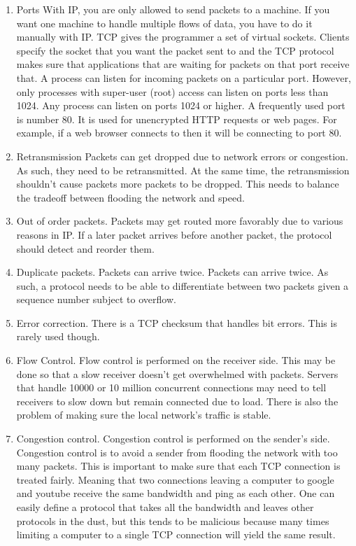 \begin{enumerate}
  \item Ports
  With IP, you are only allowed to send packets to a machine.
  If you want one machine to handle multiple flows of data, you have to do it manually with IP.
  TCP gives the programmer a set of virtual sockets.
  Clients specify the socket that you want the packet sent to and the TCP protocol makes sure that applications that are waiting for packets on that port receive that.
  A process can listen for incoming packets on a particular port.
  However, only processes with super-user (root) access can listen on ports less than 1024.
  Any process can listen on ports 1024 or higher.
  A frequently used port is number 80.
  It is used for unencrypted HTTP requests or web pages.
  For example, if a web browser connects to  then it will be connecting to port 80.

\item Retransmission
  Packets can get dropped due to network errors or congestion.
  As such, they need to be retransmitted.
  At the same time, the retransmission shouldn't cause packets more packets to be dropped.
  This needs to balance the tradeoff between flooding the network and speed.

\item Out of order packets.
  Packets may get routed more favorably due to various reasons in IP.
  If a later packet arrives before another packet, the protocol should detect and reorder them.

\item Duplicate packets.
  Packets can arrive twice.
  Packets can arrive twice.
  As such, a protocol needs to be able to differentiate between two packets given a sequence number subject to overflow.

\item Error correction.
  There is a TCP checksum that handles bit errors.
  This is rarely used though.

\item Flow Control.
  Flow control is performed on the receiver side.
  This may be done so that a slow receiver doesn't get overwhelmed with packets.
  Servers that handle 10000 or 10 million concurrent connections may need to tell receivers to slow down but remain connected due to load.
  There is also the problem of making sure the local network's traffic is stable.

\item Congestion control.
  Congestion control is performed on the sender's side.
  Congestion control is to avoid a sender from flooding the network with too many packets.
  This is important to make sure that each TCP connection is treated fairly.
  Meaning that two connections leaving a computer to google and youtube receive the same bandwidth and ping as each other.
  One can easily define a protocol that takes all the bandwidth and leaves other protocols in the dust, but this tends to be malicious because many times limiting a computer to a single TCP connection will yield the same result.


\end{enumerate}
